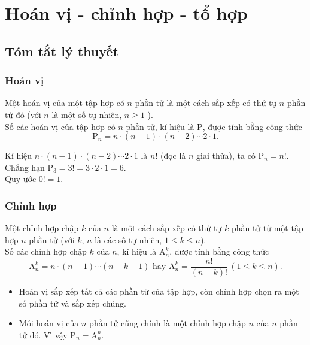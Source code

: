 \section{Hoán vị - chỉnh hợp - tổ hợp}
\subsection{Tóm tắt lý thuyết}
\subsubsection{Hoán vị}
\begin{dn}{}
	Một hoán vị của một tập hợp có $n$ phần tử là một cách sắp xếp có thứ tự $n$ phần tử đó (với $n$ là một số tự nhiên, $n \geq 1$ ).\\
	Số các hoán vị của tập hợp có $n$ phần tử, kí hiệu là $\mathrm{P}$, được tính bằng công thức $$\mathrm{P}_{n}=n \cdot(n-1) \cdot(n-2) \cdots 2 \cdot 1.$$
\end{dn}

\begin{note}
	Kí hiệu $n \cdot(n-1) \cdot(n-2) \cdots 2 \cdot 1$ là $n!$ (đọc là $n$ giai thừa), ta có $\mathrm{P}_{n}=n!$. Chẳng hạn $\mathrm{P}_{3}=3!=3 \cdot 2 \cdot 1=6$.\\
	Quy ước $0 !=1$.
\end{note}

\subsubsection{Chỉnh hợp}
\begin{dn}{}
	Một chỉnh hợp chập $k$ của $n$ là một cách sắp xếp có thứ tự $k$ phần tử từ một tập hợp $n$ phần tử (với $k$, $n$ là các số tự nhiên, $1 \leq k \leq n$).\\
	Số các chỉnh hợp chập $k$ của $n$, kí hiệu là $\mathrm{A}_{n}^{k}$, được tính bằng công thức
	$$\mathrm{A}_{n}^{k}=n \cdot(n-1) \cdots(n-k+1) \text { hay } \mathrm{A}_{n}^{k}=\dfrac{n!}{(n-k)!}\,(1 \leq k \leq n).$$
\end{dn}

\begin{note}
	\begin{itemize}
		\item Hoán vị sắp xếp tất cả các phần tử của tập hợp, còn chỉnh hợp chọn ra một số phần tử và sắp xếp chúng.
		\item Mỗi hoán vị của $n$ phần tử cũng chính là một chỉnh hợp chập $n$ của $n$ phần tử đó. Vì vậy $\mathrm{P}_{n}=\mathrm{A}_{n}^{n}$.
	\end{itemize}
\end{note}

